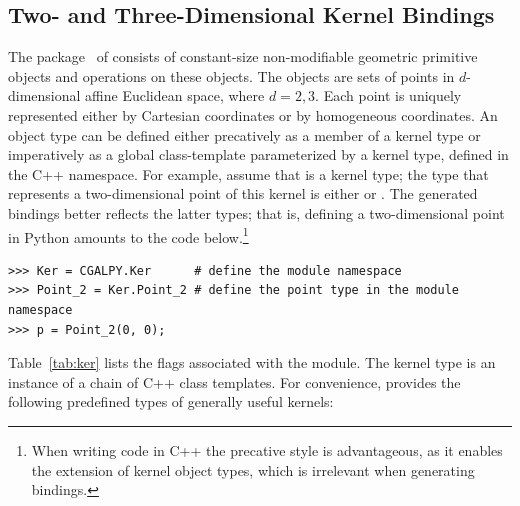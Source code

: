 \subsection{Two- and Three-Dimensional Kernel Bindings}
\label{ssec:modules:kernel}
The \iiDandiiiDGeometryKernelPackage{}
package~\cite{cgal:bfghhkps-lgk23-21a} of \cgal{} consists of
constant-size non-modifiable geometric primitive objects and
operations on these objects. The objects are sets of points in
$d$-dimensional affine Euclidean space, where $d = 2,3$.  Each point
is uniquely represented either by Cartesian coordinates or by
homogeneous coordinates. An object type can be defined either
precatively as a member of a kernel type or imperatively as a global
class-template parameterized by a kernel type, defined in the C++
 namespace. For example, assume that
 is a kernel type; the type that represents a
two-dimensional point of this kernel is either
 or
.  The generated bindings better
reflects the latter types; that is, defining a two-dimensional point in
Python amounts to the code below.\footnote{When writing code in C++ the
  precative style is advantageous, as it enables the extension of
  kernel object types, which is irrelevant when generating bindings.}
\begin{lstlisting}[style=pythonStyle,basicstyle=\normalsize]
>>> Ker = CGALPY.Ker      # define the module namespace
>>> Point_2 = Ker.Point_2 # define the point type in the module namespace
>>> p = Point_2(0, 0);
\end{lstlisting}
Table~\ref{tab:ker} lists the \cmake{} flags associated with the
\iiDandiiiDGeometryKernelPackage{} module.  The kernel type is an
instance of a chain of C++ class templates. For convenience, \cgal{}
provides the following predefined types of generally useful kernels:
